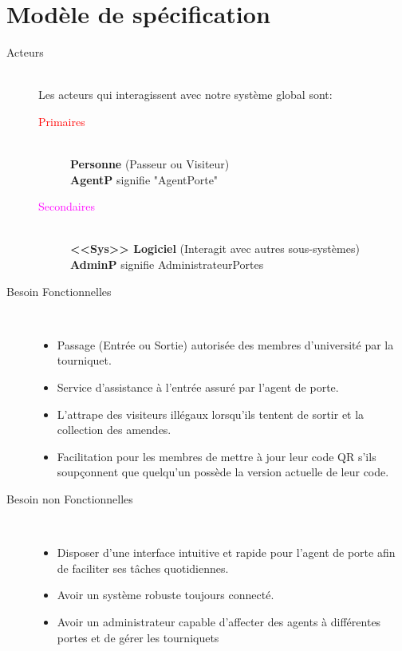 

\section{Modèle de spécification}
    
    \begin{description}
        \item[Acteurs] \hfill \\
            Les acteurs qui interagissent avec notre système global sont:
            \vspace{8px}
            \begin{description}
                \item[\textcolor{red}{Primaires}] \hfill \\ \textbf{Personne} (Passeur ou Visiteur) \\ \textbf{AgentP} signifie "AgentPorte"
                \vspace{8px}
                \item[\textcolor{magenta}{Secondaires}] \hfill \\ \textbf{<<Sys>> Logiciel} (Interagit avec autres sous-systèmes)\\ \textbf{AdminP} signifie AdministrateurPortes
            \end{description}
        
        \vspace{8px}
        \item[Besoin Fonctionnelles] \hfill \\
            \begin{itemize}[label=•]
                \item Passage (Entrée ou Sortie) autorisée des membres d'université par la tourniquet.
                \item Service d'assistance à l'entrée assuré par l'agent de porte.  
                \item L'attrape des visiteurs illégaux lorsqu'ils tentent de sortir et la collection des amendes.
                \item Facilitation pour les membres de mettre à jour leur code QR s'ils soupçonnent que quelqu'un possède la version actuelle de leur code. 
            \end{itemize}
        \vspace{8px}
        \item[Besoin non Fonctionnelles] \hfill \\
            \begin{itemize}[label=•]
                \item Disposer d'une interface intuitive et rapide pour l'agent de porte afin de faciliter ses tâches quotidiennes.
                \item Avoir un système robuste toujours connecté.
                \item Avoir un administrateur capable d'affecter des agents à différentes portes et de gérer les tourniquets
            \end{itemize}
    \end{description}
    \pagebreak

